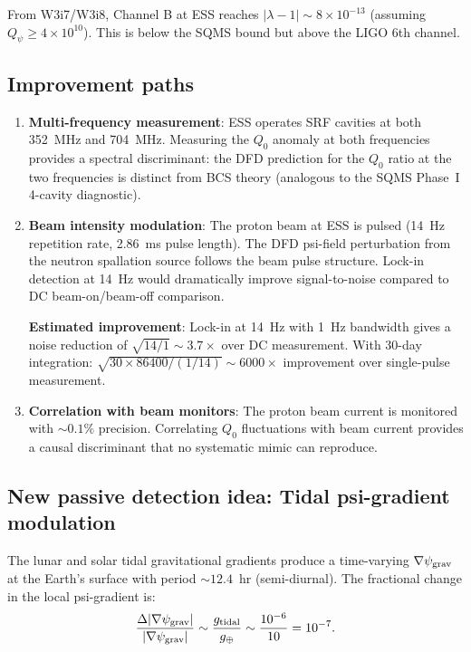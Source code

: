 \documentclass[11pt]{article}
\newcommand{\ee}[1]{\times 10^{#1}}
\newcommand{\psigrav}{\psi_{\rm grav}}
\newcommand{\lambdaone}{|\lambda{-}1|}
\newcommand{\Qpsi}{Q_\psi}
\begin{document}
From W3i7/W3i8, Channel B at ESS reaches $\lambdaone \sim 8\ee{-13}$
(assuming $\Qpsi \geq 4\ee{10}$). This is below the SQMS bound but
above the LIGO 6th channel.

\subsection{Improvement paths}

\begin{enumerate}
\item \textbf{Multi-frequency measurement}: ESS operates SRF cavities
  at both 352~MHz and 704~MHz. Measuring the $Q_0$ anomaly at both
  frequencies provides a spectral discriminant: the DFD prediction for
  the $Q_0$ ratio at the two frequencies is distinct from BCS theory
  (analogous to the SQMS Phase~I 4-cavity diagnostic).

\item \textbf{Beam intensity modulation}: The proton beam at ESS is
  pulsed (14~Hz repetition rate, 2.86~ms pulse length). The DFD psi-field
  perturbation from the neutron spallation source follows the beam pulse
  structure. Lock-in detection at 14~Hz would dramatically improve
  signal-to-noise compared to DC beam-on/beam-off comparison.

  \textbf{Estimated improvement}: Lock-in at 14~Hz with 1~Hz bandwidth
  gives a noise reduction of $\sqrt{14/1} \sim 3.7\times$ over DC
  measurement. With 30-day integration: $\sqrt{30 \times 86400 / (1/14)}
  \sim 6000\times$ improvement over single-pulse measurement.

\item \textbf{Correlation with beam monitors}: The proton beam current
  is monitored with $\sim 0.1\%$ precision. Correlating $Q_0$
  fluctuations with beam current provides a causal discriminant that
  no systematic mimic can reproduce.
\end{enumerate}

\subsection{New passive detection idea: Tidal psi-gradient modulation}

The lunar and solar tidal gravitational gradients produce a
time-varying $\nabla\psigrav$ at the Earth's surface with period
$\sim 12.4$~hr (semi-diurnal). The fractional change in the local
psi-gradient is:
\begin{equation}
\frac{\Delta|\nabla\psigrav|}{|\nabla\psigrav|}
\sim \frac{g_{\rm tidal}}{g_\oplus}
\sim \frac{10^{-6}}{10} = 10^{-7}.
\end{equation}
\end{document}
